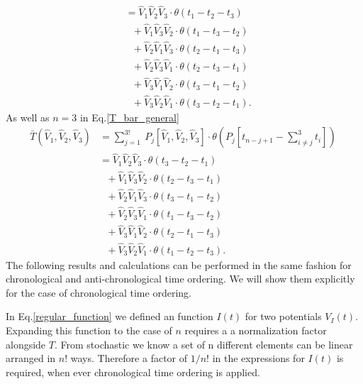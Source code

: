 \documentclass[12pt, titlepage]{article}
\begin{document}
\begin{subappendices}
\begin{equation}
\begin{split}
\\
&=\hat{V}_{1}\hat{V}_{2}\hat{V}_{3}\cdot \theta(t_{1}-t_{2}-t_{3})
	\\
	& \ \ \ +\hat{V}_{1}\hat{V}_{3}\hat{V}_{2} \cdot \theta(t_{1}-t_{3}-t_{2})
	\\
	& \ \ \ +\hat{V}_{2}\hat{V}_{1}\hat{V}_{3} \cdot \theta(t_{2}-t_{1}-t_{3})
	\\
	& \ \ \ +\hat{V}_{2}\hat{V}_{3}\hat{V}_{1} \cdot \theta(t_{2}-t_{3}-t_{1})
	\\
	& \ \ \ +\hat{V}_{3}\hat{V}_{1}\hat{V}_{2} \cdot \theta(t_{3}-t_{1}-t_{2})
	\\
	& \ \ \ +\hat{V}_{3}\hat{V}_{2}\hat{V}_{1} \cdot \theta(t_{3}-t_{2}-t_{1}).
\end{split}
\end{equation}
As well as $ n=3 $ in Eq.\enskip\eqref{T_bar_general}
\begin{equation}
\begin{split}
\bar{T}(\hat{V}_1, \hat{V}_2,\hat{V}_3)
&=
\sum_{j=1}^{3!}\ P_{j}
\left[
\hat{V}_1, \hat{V}_2,\hat{V}_3
 \right]  
\cdot
\theta \left(P_{j}\left[t_{n-j+1} -\sum_{i\neq j}^{3} t_{i}\right]\right)\
\\
&=\hat{V}_{1}\hat{V}_{2}\hat{V}_{3}\cdot \theta(t_{3}-t_{2}-t_{1})
	\\
	& \ \ \ +\hat{V}_{1}\hat{V}_{3}\hat{V}_{2} \cdot \theta(t_{2}-t_{3}-t_{1})
	\\
	& \ \ \ +\hat{V}_{2}\hat{V}_{1}\hat{V}_{3} \cdot \theta(t_{3}-t_{1}-t_{2})
	\\
	& \ \ \ +\hat{V}_{2}\hat{V}_{3}\hat{V}_{1} \cdot \theta(t_{1}-t_{3}-t_{2})
	\\
	& \ \ \ +\hat{V}_{3}\hat{V}_{1}\hat{V}_{2} \cdot \theta(t_{2}-t_{1}-t_{3})
	\\
	& \ \ \ +\hat{V}_{3}\hat{V}_{2}\hat{V}_{1} \cdot \theta(t_{1}-t_{2}-t_{3}).
\end{split}
\end{equation}
The following results and calculations can be performed in the same fashion for chronological and anti-chronological time ordering. We will show them explicitly for the case of chronological time ordering.

In Eq.\enskip\eqref{regular_function} we defined an function $ I(t)$ for two potentials $ V_I(t) $. Expanding this function to the case of $ n $ requires a a normalization factor alongside $ T $. From stochastic we know a set of n different elements can be linear arranged in $ n! $ ways. Therefore a factor of $ 1/{n!} $ in the expressions for $ I(t)$ is required, when ever chronological time ordering is applied.  


\end{subappendices}
\end{document}

